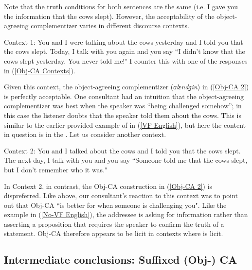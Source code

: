 \documentclass[output=paper,newtxmath,modfonts,nonflat,hidelinks]{langsci/langscibook}
\begin{document}
\noindent Note that the truth conditions for both sentences are the same (i.e. I gave you the information that the cows slept). However, the acceptability of the object-agreeing complementizer varies in different discourse contexts.

\ea %
Context 1: You and I were talking about the cows yesterday and I told you that the cows slept. Today, I talk with you again and you say ``I didn't know that the cows slept yesterday. You never told me!" I counter this with one of the responses in (\ref{Obj-CA Contexts}).
\z

\noindent Given this context, the object-agreeing complementizer (\textit{ɑlɛndʒin}) in (\ref{Obj-CA 2}) is perfectly acceptable. One consultant had an intuition that the object-agreeing complementizer was best when the speaker was ``being challenged somehow''; in this case the listener doubts that the speaker told them about the cows. This is similar to the earlier provided example of  in (\ref{VF English}), but here the content in question is in the . Let us consider another context.

\ea %
Context 2: You and I talked about the cows and I told you that the cows slept. The next day, I talk with you and you say ``Someone told me that the cows slept, but I don't remember who it was."
\z

\noindent In Context 2, in contrast, the Obj-CA construction in (\ref{Obj-CA 2}) is dispreferred. Like above, our consultant's reaction to this context was to point out that Obj-CA ``is better for when someone is challenging you". Like the example in (\ref{No-VF English}), the addressee is asking for information rather than asserting a proposition that requires the speaker to confirm the truth of a statement. Obj-CA therefore appears to be licit in contexts where  is licit.


\subsection{Intermediate conclusions: Suffixed (Obj-) CA}
\end{document}
